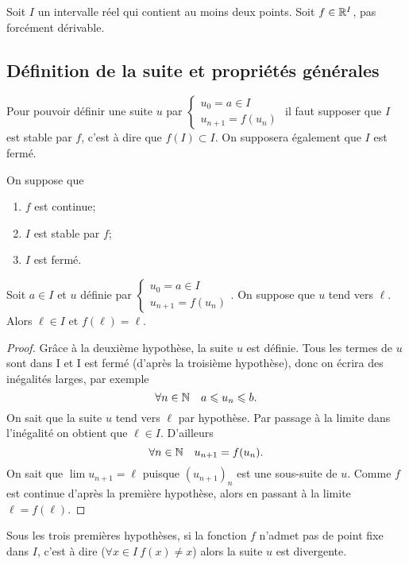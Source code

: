 Soit \(I\) un intervalle réel qui contient au moins deux points. Soit \(f \in
\mathbb{R}^I\), pas forcément dérivable.

\subsection{Définition de la suite et propriétés générales}

Pour pouvoir définir une suite \(u\) par \(\begin{cases} u_0=a \in I \\
u_{n+1}=f(u_n) \end{cases}\) il faut supposer que \(I\) est stable par \(f\),
c'est à dire que \(f(I) \subset I\). On supposera également que \(I\) est fermé.

\begin{prop}
  On suppose que \begin{enumerate}
    \item \(f\) est continue;
    \item \(I\) est stable par \(f\);
    \item \(I\) est fermé.
  \end{enumerate}
  Soit \(a \in I\) et \(u\) définie par \(\begin{cases} u_0=a \in I \\
  u_{n+1}=f(u_n) \end{cases}\). On suppose que \(u\) tend vers \(\ell\). Alors
  \(\ell \in I\) et \(f(\ell)=\ell\).
\end{prop}
\begin{proof}
  Grâce à la deuxième hypothèse, la suite \(u\) est définie. Tous les termes de
  \(u\) sont dans I et I est fermé (d'après la troisième hypothèse), donc on
  écrira des inégalités larges, par exemple
  \begin{equation}
    \forall n \in \mathbb{N} \quad a \leqslant u_n \leqslant b.
  \end{equation}
  On sait que la suite \(u\) tend vers \(\ell\) par hypothèse. Par passage à la
  limite dans l'inégalité on obtient que \(\ell \in I\). D'ailleurs
  \begin{equation}
    \forall n \in \mathbb{N} \quad u_{n+1}=f(u_n).
  \end{equation}
  On sait que \(\lim u_{n+1}=\ell\) puisque \((u_{n+1})_n\) est une sous-suite
  de \(u\). Comme \(f\) est continue d'après la première hypothèse, alors en
  passant à la limite \(\ell=f(\ell)\).
\end{proof}

Sous les trois premières hypothèses, si la fonction \(f\) n'admet pas de point
fixe dans \(I\), c'est à dire (\(\forall x \in I \ f(x) \neq x\)) alors la suite
\(u\) est divergente.

